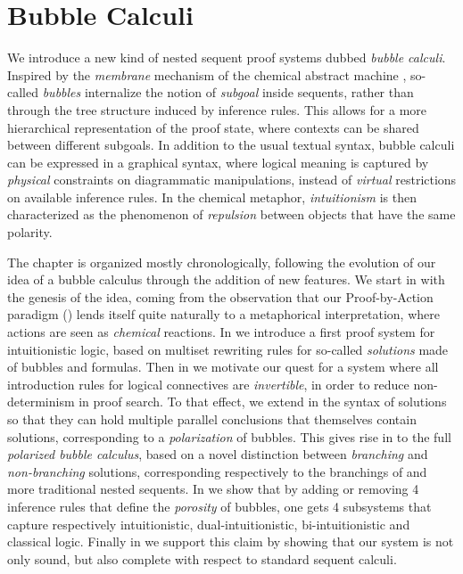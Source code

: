 \setchapterpreamble[u]{\margintoc}
\chapter{Bubble Calculi}

We introduce a new kind of nested sequent proof systems dubbed \emph{bubble
calculi}. Inspired by the \emph{membrane} mechanism of the chemical abstract
machine , so-called \emph{bubbles}
internalize the notion of \emph{subgoal} inside sequents, rather than through
the tree structure induced by inference rules. This allows for a more
hierarchical representation of the proof state, where contexts can be shared
between different subgoals. In addition to the usual textual syntax, bubble
calculi can be expressed in a graphical syntax, where logical meaning is
captured by \emph{physical} constraints on diagrammatic manipulations, instead
of \emph{virtual} restrictions on available inference rules. In the chemical
metaphor, \emph{intuitionism} is then characterized as the phenomenon of
\emph{repulsion} between objects that have the same polarity.

The chapter is organized mostly chronologically, following the evolution of our
idea of a bubble calculus through the addition of new features. We start in
 with the genesis of the idea, coming from the observation that
our Proof-by-Action paradigm () lends itself quite naturally to a
metaphorical interpretation, where actions are seen as \emph{chemical}
reactions. In  we introduce a first proof system for
intuitionistic logic, based on multiset rewriting rules for so-called
\emph{solutions} made of bubbles and formulas. Then in 
we motivate our quest for a system where all introduction rules for logical
connectives are \emph{invertible}, in order to reduce non-determinism in proof
search. To that effect, we extend in  the syntax of solutions so
that they can hold multiple parallel conclusions that themselves contain
solutions, corresponding to a \emph{polarization} of bubbles. This gives rise in
 to the full \emph{polarized bubble calculus}, based
on a novel distinction between \emph{branching} and \emph{non-branching}
solutions, corresponding respectively to the branchings of
 and more traditional nested sequents. In
 we show that by adding or removing 4 inference rules
that define the \emph{porosity} of bubbles, one gets 4 subsystems that capture
respectively intuitionistic, dual-intuitionistic, bi-intuitionistic and
classical logic. Finally in  we support this claim
by showing that our system is not only sound, but also complete with respect to
standard sequent calculi.


